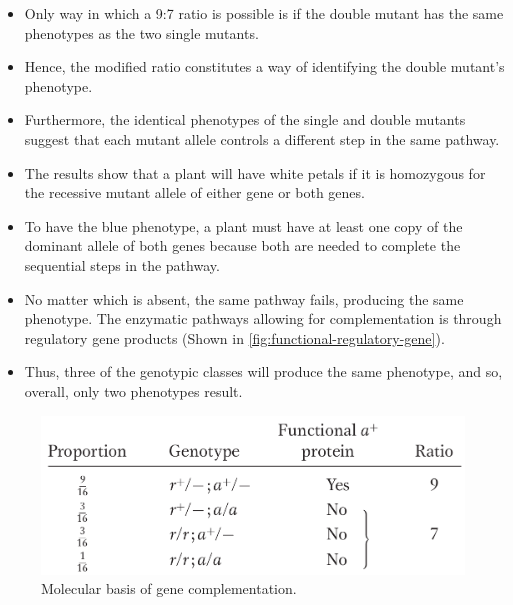 \documentclass[11pt,dvipsnames,ignorenonframetext,aspectratio=169]{beamer}
\providecommand{\tightlist}{%
  \setlength{\itemsep}{0pt}\setlength{\parskip}{0pt}}
\begin{document}
\begin{frame}{}
\protect\hypertarget{section-16}{}
\begin{itemize}
\tightlist
\item
  Only way in which a 9:7 ratio is possible is if the double mutant has
  the same phenotypes as the two single mutants.
\item
  Hence, the modified ratio constitutes a way of identifying the double
  mutant's phenotype.
\item
  Furthermore, the identical phenotypes of the single and double mutants
  suggest that each mutant allele controls a different step in the same
  pathway.
\item
  The results show that a plant will have white petals if it is
  homozygous for the recessive mutant allele of either gene or both
  genes.
\item
  To have the blue phenotype, a plant must have at least one copy of the
  dominant allele of both genes because both are needed to complete the
  sequential steps in the pathway.
\item
  No matter which is absent, the same pathway fails, producing the same
  phenotype. The enzymatic pathways allowing for complementation is
  through regulatory gene products (Shown in
  \ref{fig:functional-regulatory-gene}).
\item
  Thus, three of the genotypic classes will produce the same phenotype,
  and so, overall, only two phenotypes result.
\end{itemize}
\end{frame}

\begin{frame}{}
\protect\hypertarget{section-17}{}
\begin{figure}

{\centering \includegraphics[width=0.5\linewidth]{./../images/gene_same_pathway2} 

}

\caption{Molecular basis of gene complementation.}\label{fig:gene-in-same-pathway2}
\end{figure}
\end{frame}
\end{document}

